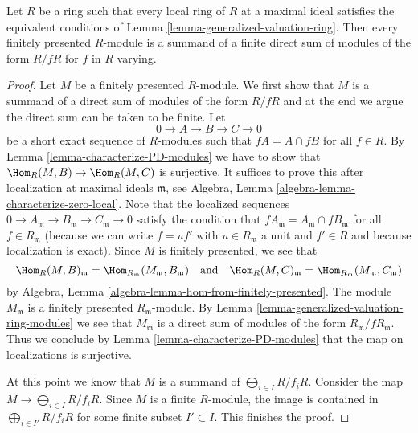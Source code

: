 \begin{lemma}
\label{lemma-warfield}
\begin{reference}
\cite[Theorem 3]{Warfield-Decomposition}
\end{reference}
Let $R$ be a ring such that every local ring of $R$ at a maximal
ideal satisfies the equivalent conditions of
Lemma \ref{lemma-generalized-valuation-ring}.
Then every finitely presented $R$-module is a summand of a 
finite direct sum of modules of the form $R/fR$ for $f$ in $R$ varying.
\end{lemma}

\begin{proof}
Let $M$ be a finitely presented $R$-module. We first show that $M$ is a
summand of a direct sum of modules of the form $R/fR$ and at the end we
argue the direct sum can be taken to be finite. Let
$$
0 \to A \to B \to C \to 0
$$
be a short exact sequence of $R$-modules such that $fA = A \cap fB$
for all $f \in R$. By Lemma \ref{lemma-characterize-PD-modules}
we have to show that $\Hom_R(M, B) \to \Hom_R(M, C)$ is surjective.
It suffices to prove this after localization at maximal ideals
$\mathfrak m$, see
Algebra, Lemma \ref{algebra-lemma-characterize-zero-local}.
Note that the localized
sequences $0 \to A_\mathfrak m \to B_\mathfrak m \to C_\mathfrak m \to 0$
satisfy the condition that $fA_\mathfrak m = A_\mathfrak m \cap fB_\mathfrak m$
for all $f \in R_\mathfrak m$ (because we can write $f = uf'$ with
$u \in R_\mathfrak m$ a unit and $f' \in R$ and because localization
is exact). Since $M$ is finitely presented, we see that
$$
\Hom_R(M, B)_\mathfrak m = \Hom_{R_\mathfrak m}(M_\mathfrak m, B_\mathfrak m)
\quad\text{and}\quad
\Hom_R(M, C)_\mathfrak m = \Hom_{R_\mathfrak m}(M_\mathfrak m, C_\mathfrak m)
$$
by Algebra, Lemma \ref{algebra-lemma-hom-from-finitely-presented}.
The module $M_\mathfrak m$ is a finitely presented $R_\mathfrak m$-module. By
Lemma \ref{lemma-generalized-valuation-ring-modules}
we see that $M_\mathfrak m$ is a direct sum of modules
of the form $R_\mathfrak m/fR_\mathfrak m$. Thus we conclude by
Lemma \ref{lemma-characterize-PD-modules} that the map on
localizations is surjective.

\medskip\noindent
At this point we know that $M$ is a summand of
$\bigoplus_{i \in I} R/f_i R$. Consider the map
$M \to \bigoplus_{i \in I} R/f_i R$. Since $M$ is a finite $R$-module,
the image is contained in $\bigoplus_{i \in I'} R/f_i R$ for some finite
subset $I' \subset I$. This finishes the proof.
\end{proof}

